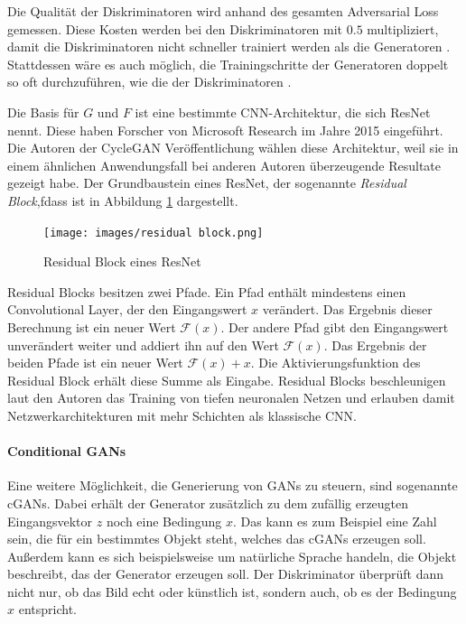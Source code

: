 Die Qualität der Diskriminatoren wird anhand des gesamten Adversarial Loss gemessen. Diese Kosten werden bei den Diskriminatoren mit $0.5$ multipliziert, damit die Diskriminatoren nicht schneller trainiert werden als die Generatoren \cite{cyclegan-tutorial}. Stattdessen wäre es auch möglich, die Trainingschritte der Generatoren doppelt so oft durchzuführen, wie die der Diskriminatoren \cite{visualApproach}.

Die Basis für $G$ und $F$ ist eine bestimmte \ac{CNN}-Architektur, die sich \ac{ResNet} nennt. Diese haben Forscher von Microsoft Research im Jahre 2015 eingeführt. Die Autoren der \ac{CycleGAN} Veröffentlichung wählen diese Architektur, weil sie in einem ähnlichen Anwendungsfall bei anderen Autoren überzeugende Resultate gezeigt habe. Der Grundbaustein eines \ac{ResNet}, der sogenannte \emph{Residual Block},fdass  ist in Abbildung \ref{fig:residual-block} dargestellt. \cite{resnet} \Cite{cycleGAN}

\begin{figure}[h]
   \centering
   \texttt{[image: images/residual block.png]}
   \caption{Residual Block eines ResNet \cite{resnet}}
   \label{fig:residual-block}
\end{figure}

Residual Blocks besitzen zwei Pfade. Ein Pfad enthält mindestens einen Convolutional Layer, der den Eingangswert $x$ verändert. Das Ergebnis dieser Berechnung ist ein neuer Wert $\mathcal{F}(x)$. Der andere Pfad gibt den Eingangswert unverändert weiter und addiert ihn auf den Wert $\mathcal{F}(x)$. Das Ergebnis der beiden Pfade ist ein neuer Wert $\mathcal{F}(x) + x$. Die Aktivierungsfunktion des Residual Block erhält diese Summe als Eingabe. Residual Blocks beschleunigen laut den Autoren das Training von tiefen neuronalen Netzen und erlauben damit Netzwerkarchitekturen mit mehr Schichten als klassische \ac{CNN}. \cite{resnet}

\paragraph{Conditional GANs}
Eine weitere Möglichkeit, die Generierung von \acp{GAN} zu steuern, sind sogenannte \acp{cGAN}. Dabei erhält der Generator zusätzlich zu dem zufällig erzeugten Eingangsvektor $z$ noch eine Bedingung $x$. Das kann es zum Beispiel eine Zahl sein, die für ein bestimmtes Objekt steht, welches das \acp{cGAN} erzeugen soll. Außerdem kann es sich beispielsweise um natürliche Sprache handeln, die Objekt beschreibt, das der Generator erzeugen soll. Der Diskriminator überprüft dann nicht nur, ob das Bild echt oder künstlich ist, sondern auch, ob es der Bedingung $x$ entspricht.


